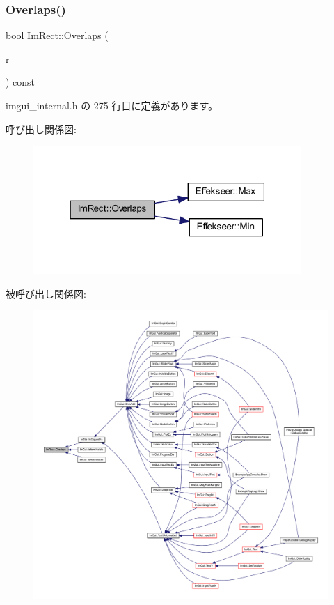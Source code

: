 \subsubsection{\texorpdfstring{Overlaps()}{Overlaps()}}
{\footnotesize\ttfamily bool Im\+Rect\+::\+Overlaps (\begin{DoxyParamCaption}\item[{const \mbox{\hyperlink{struct_im_rect}{Im\+Rect}} \&}]{r }\end{DoxyParamCaption}) const\hspace{0.3cm}{\ttfamily [inline]}}



 imgui\+\_\+internal.\+h の 275 行目に定義があります。

呼び出し関係図\+:\nopagebreak
\begin{figure}[H]
\begin{center}
\leavevmode
\includegraphics[width=289pt]{struct_im_rect_a0af3bade3781e5e7c6afdf71ccfb0d43_cgraph}
\end{center}
\end{figure}
被呼び出し関係図\+:\nopagebreak
\begin{figure}[H]
\begin{center}
\leavevmode
\includegraphics[width=350pt]{struct_im_rect_a0af3bade3781e5e7c6afdf71ccfb0d43_icgraph}
\end{center}
\end{figure}
\mbox{\label{struct_im_rect_ae964217d0317002b1ae80f935c97e689}} 
